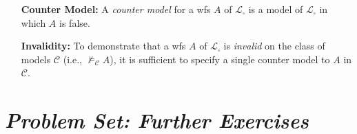 \documentclass[a4paper, 11pt]{article} %
\newcommand{\set}[1]{\lbrace#1\rbrace} %
\begin{document}
\begin{enumerate}[leftmargin=1.2in,labelsep=.15in]
\begin{enumerate}
	\item[$(S4)$] The system $S4$ is sound and complete over the reflexive and transitive models $\mathcal{C}_{S4}=\mathcal{C}_r\bigcap\mathcal{C}_t$, i.e., $\vdash_{S4} A$ if and only if $\vDash_{\mathcal{C}_{S4}} A$.\footnote{The intersection $X\bigcap Y$ is the set of elements in both $X$ and $Y$, i.e., $X\bigcap Y=\set{z:z\in X ~\text{and}~ z\in Y}$.}
	\item[$(S5)$] The modal system $S5$ is sound and complete over the class of all reflexive, symmetric, and transitive models $\mathcal{C}_{S5}=\mathcal{C}_r\bigcap\mathcal{C}_s\bigcap\mathcal{C}_t$, i.e., $\vdash_{S5} A$ if and only if $\vDash_{\mathcal{C}_{S5}} A$.\footnote{See \citet{Hughes1996} for proofs of soundness and completeness for $K,T,S4$, and $S5$.}
	\end{enumerate}
\item[\bf Counter Model:] A \textit{counter model} for a wfs $A$ of $\mathcal{L}_\square$ is a model of $\mathcal{L}_\square$ in which $A$ is false.
\item[\bf Invalidity:] To demonstrate that a wfs $A$ of $\mathcal{L}_\square$ is \textit{invalid} on the class of models $\mathcal{C}$ (i.e., $\nvDash_\mathcal{C} A$), it is sufficient to specify a single counter model to $A$ in $\mathcal{C}$.
\end{enumerate}




\section*{\it Problem Set: Further Exercises}
\end{document}
